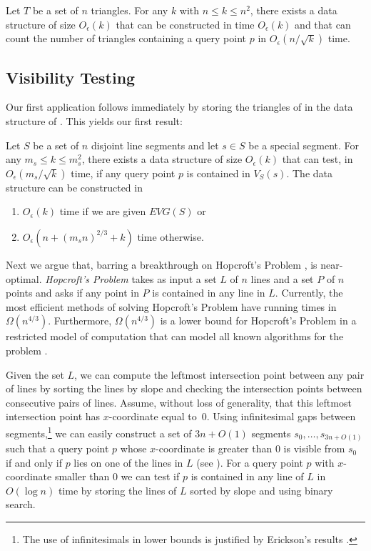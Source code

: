 \documentclass{patmorin}
\newcommand{\EVG}{\mathit{EVG}}
\newcommand{\Oe}{O_\epsilon}
\begin{document}
\begin{thm}[\cite{ae99,m92}]
Let $T$ be a set of $n$ triangles. For any $k$ with $n\le k\le n^2$, there
exists a data structure of size $\Oe(k)$ that can be constructed in time
$\Oe(k)$ and that can count the number of triangles containing a query
point $p$ in $\Oe(n/\sqrt{k})$ time.
\end{thm}


\subsection{Visibility Testing} \label{sec:VizTesting}

Our first application follows immediately by storing the triangles of
 in the data structure of .  This
yields our first result:

\begin{thm}
Let $S$ be a set of $n$ disjoint line segments and let $s\in S$
be a special segment.  For any $m_s\le k\le m_s^2$, there exists a
data structure of size $\Oe(k)$ that can test, in $\Oe(m_s/\sqrt{k})$ time,
if any query point $p$ is contained in $V_S(s)$.  The data structure can be constructed in
\begin{enumerate}
 \item $\Oe(k)$ time if we are given $\EVG(S)$ or
 \item  $\Oe(n + (m_sn)^{2/3} + k)$ time otherwise.
\end{enumerate}
\end{thm}


Next we argue that, barring a breakthrough on Hopcroft's Problem
\cite{e96},  is near-optimal.  \emph{Hopcroft's
Problem} takes as input a set $L$ of $n$ lines and a set $P$ of $n$ points
and asks if any point in $P$ is contained in any line in $L$. Currently,
the most efficient methods of solving Hopcroft's Problem have running
times in $\Omega(n^{4/3})$.  Furthermore, $\Omega(n^{4/3})$ is a lower
bound for Hopcroft's Problem in a restricted model of computation that
can model all known algorithms for the problem \cite{e96}.

Given the set $L$, we can compute the leftmost intersection point between
any pair of lines by sorting the lines by slope and checking the
intersection points between consecutive pairs of lines.  Assume, without
loss of generality, that this leftmost intersection point has
$x$-coordinate equal to~0. Using infinitesimal gaps between
segments,\footnote{The use of infinitesimals in lower bounds is justified
by Erickson's results \cite{e99b}.} we can easily construct a set of $3n+O(1)$
segments $s_0,\ldots,s_{3n+O(1)}$ such that a query point $p$ whose
$x$-coordinate is greater than 0 is visible from $s_0$ if and only if $p$
lies on one of the lines in $L$ (see ). For a query point
$p$ with $x$-coordinate smaller than 0 we can test if $p$ is contained in
any line of $L$ in $O(\log n)$ time by storing the lines of $L$ sorted by
slope and using binary search.
\end{document}
